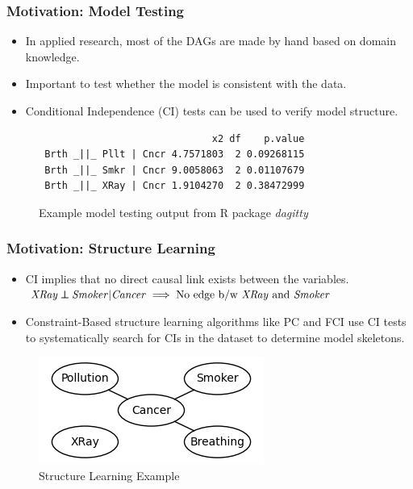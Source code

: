 \documentclass{beamer}
\def\ci{\perp\!\!\!\!\!\perp}
\begin{document}
\begin{frame}[fragile]
	\frametitle{Motivation: Model Testing}
	\begin{itemize}
		\setlength\itemsep{1em}
		\item In applied research, most of the DAGs are made by hand
			based on domain knowledge.
		\item Important to test whether the model is consistent with the data.
		\item Conditional Independence (CI) tests can be used to verify model structure.
	\end{itemize}
	\vspace{1em}
	\begin{figure}
 	\begin{verbatim}
                              x2 df    p.value
 Brth _||_ Pllt | Cncr 4.7571803  2 0.09268115
 Brth _||_ Smkr | Cncr 9.0058063  2 0.01107679
 Brth _||_ XRay | Cncr 1.9104270  2 0.38472999
 	\end{verbatim}
		\caption*{Example model testing output from R package \emph{dagitty}}
	\end{figure}

\end{frame}

\begin{frame}
	\frametitle{Motivation: Structure Learning}
	\begin{itemize}
		\setlength\itemsep{1em}
		\item CI implies that no direct causal link exists between the variables. \newline
			$ \text{\emph{XRay}} \ci \text{\emph{Smoker}} | \text{\emph{Cancer}} \implies \text{No edge b/w \emph{XRay} and \emph{Smoker}} $

		\item Constraint-Based structure learning algorithms like PC
			and FCI use CI tests to systematically search for CIs
			in the dataset to determine model skeletons.
	\end{itemize}
	\begin{figure}
		\centering
		\includegraphics[scale=0.6]{imgs/example_sl.png}
		\caption*{Structure Learning Example}
	\end{figure}
\end{frame}
\end{document}
